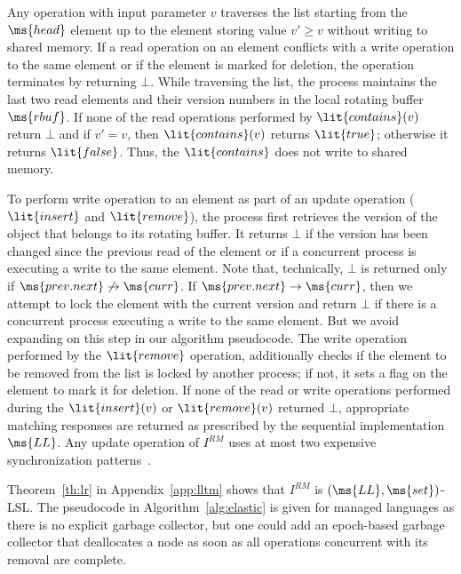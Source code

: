 \documentclass[11pt,pdftex,letterpaper]{article}
\newcommand{\LL}{\ms{LL}}
\begin{document}
Any operation with input parameter $v$ traverses the list starting from the
$\ms{head}$ element up to the element storing value $v'\geq v$ without writing to shared memory.
If a read operation on an element conflicts with a write operation to the same element or
if the element is marked for deletion, the operation terminates by returning $\bot$.
While traversing the list, the process maintains the last two read elements and their version numbers 
in the local rotating buffer $\ms{rbuf}$. If none of the read operations performed by $\lit{contains}(v)$ return $\bot$
and if $v'=v$, then $\lit{contains}(v)$ returns $\lit{true}$; otherwise it returns $\lit{false}$.
Thus, the $\lit{contains}$ does not write to shared memory.

To perform write operation to an element as part of an update operation ($\lit{insert}$ and $\lit{remove}$), the process 
first retrieves the version of the object that belongs to its rotating buffer.
It returns $\bot$ if the version has been changed since the previous read of the element 
or if a concurrent process is executing a write to the same element.
Note that, technically, $\bot$ is returned only if $\ms{prev.next}\not\rightarrow \ms{curr}$.
If $\ms{prev.next}\rightarrow \ms{curr}$, then we attempt to lock the element with the current version
and return $\bot$ if there is a concurrent process executing a write to the same element.
But we avoid expanding
on this step in our algorithm pseudocode.
The write operation performed by the $\lit{remove}$ operation, additionally checks if the element to be removed
from the list is locked by another process; if not, it sets a flag on the element to mark it for deletion.
If none of the read or write operations performed during the $\lit{insert}(v)$ or $\lit{remove}(v)$ returned $\bot$,
appropriate matching responses are returned as prescribed by the sequential implementation $\LL$.
Any update operation of $I^{RM}$ uses at most two expensive synchronization
patterns~\cite{AGK11-popl}.

Theorem~\ref{th:lr} in Appendix~\ref{app:lltm} shows that $I^{RM}$ is $(\LL,\ms{set})$-LSL.
The pseudocode in Algorithm~\ref{alg:elastic} is given for managed languages as there is no explicit garbage collector, 
but one could add 
an epoch-based garbage collector that deallocates a node as soon as all operations concurrent with its removal are complete.
\end{document}
